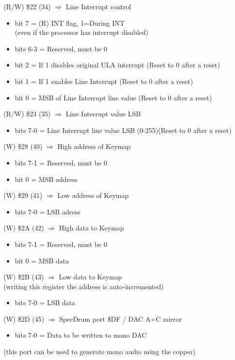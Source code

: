 (R/W) \$22 (34) $\Rightarrow$ Line Interrupt control
\begin{itemize}
\item[] bit 7 = (R) INT flag, 1=During INT\\
  (even if the processor has interrupt disabled)
\item[] bits 6-3 = Reserved, must be 0
\item[] bit 2 = If 1 disables original ULA interrupt (Reset to 0 after a reset)
\item[] bit 1 = If 1 enables Line Interrupt (Reset to 0 after a reset)
\item[] bit 0 = MSB of Line Interrupt line value (Reset to 0 after a reset)
\end{itemize}

(R/W) \$23 (35) $\Rightarrow$ Line Interrupt value LSB
\begin{itemize}
\item[] bits 7-0 = Line Interrupt line value LSB (0-255)(Reset to 0
  after a reset)
\end{itemize}

(W) \$28 (40) $\Rightarrow$ High address of Keymap
\begin{itemize}
\item[] bits 7-1 = Reserved, must be 0
\item[] bit 0 = MSB address
\end{itemize}

(W) \$29 (41) $\Rightarrow$ Low address of Keymap
\begin{itemize}
\item[] bits 7-0 = LSB adress
\end{itemize}

(W) \$2A (42) $\Rightarrow$ High data to Keymap
\begin{itemize}
\item[] bits 7-1 = Reserved, must be 0
\item[] bit 0 = MSB data
\end{itemize}

(W) \$2B (43) $\Rightarrow$ Low data to Keymap\\
(writing this register the address is auto-incremented)
\begin{itemize}
\item[] bits 7-0 = LSB data
\end{itemize}

(W) \$2D (45) $\Rightarrow$ SpecDrum port \$DF / DAC A+C mirror
\begin{itemize}
\item[] bits 7-0 = Data to be written to mono DAC
\end{itemize}
(this port can be used to generate mono audio using the copper)

